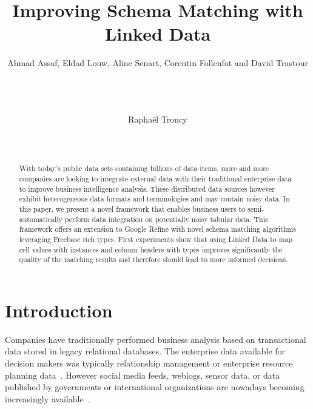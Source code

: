 \documentclass{../../Util/LaTEX/sig-alternate}
\begin{document}
\title{Improving Schema Matching with Linked Data}

\author{
\alignauthor
Ahmad Assaf, Eldad Louw, Aline Senart, Corentin Follenfat and David Trastour\\
       \\
       \\
       \\
\and
\alignauthor
Rapha\"el Troncy \\
       \\
       \\
}
\maketitle


\begin{abstract}
With today's public data sets containing billions of data items, more and more companies are looking to integrate external data with their traditional enterprise data to improve business intelligence analysis. These distributed data sources however exhibit heterogeneous data formats and terminologies and may contain noisy data. In this paper, we present a novel framework that enables business users to semi-automatically perform data integration on potentially noisy tabular data. This framework offers an extension to Google Refine with novel schema matching algorithms leveraging Freebase rich types. First experiments show that using Linked Data to map cell values with instances and column headers with types improves significantly the quality of the matching results and therefore should lead to more informed decisions.
\end{abstract}


\section{Introduction}

Companies have traditionally performed business analysis based on transactional data stored in legacy relational databases. The enterprise data available for decision makers was typically relationship management or enterprise resource planning data~\cite{Hernandez:2013:DDM:2462633}. However social media feeds, weblogs, sensor data, or data published by governments or international organizations are nowadays becoming increasingly available~\cite{citeulike:9784019}.
\end{document}
